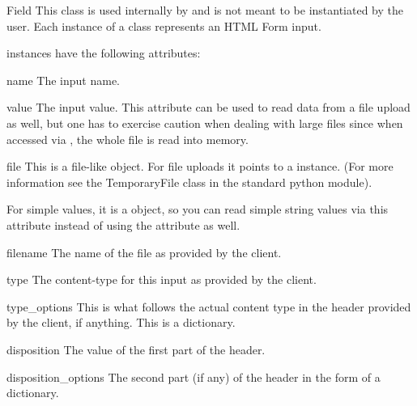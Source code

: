 \begin{classdesc}{Field}{}
  This class is used internally by  and is not
  meant to be instantiated by the user. Each instance of a 
  class represents an HTML Form input.

   instances have the following attributes:

  \begin{memberdesc}{name}
    The input name.
  \end{memberdesc}

  \begin{memberdesc}{value}
    The input value. This attribute can be used to read data from a file
    upload as well, but one has to exercise caution when dealing with
    large files since when accessed via , the whole file is
    read into memory.
  \end{memberdesc}

  \begin{memberdesc}{file}
    This is a file-like object. For file uploads it points to a 
     instance. (For more information see the TemporaryFile
    class in the standard python
     module).

    For simple values, it is a  object, so you can read
    simple string values via this attribute instead of using the 
    attribute as well.
  \end{memberdesc}

  \begin{memberdesc}{filename}
    The name of the file as provided by the client.
  \end{memberdesc}

  \begin{memberdesc}{type}
    The content-type for this input as provided by the client.
  \end{memberdesc}

  \begin{memberdesc}{type_options}
    This is what follows the actual content type in the 
    header provided by the client, if anything. This is a dictionary.
  \end{memberdesc}

  \begin{memberdesc}{disposition}
    The value of the first part of the  header.
  \end{memberdesc}

  \begin{memberdesc}{disposition_options}
    The second part (if any) of the  header in
    the form of a dictionary.
  \end{memberdesc}

  \begin{seealso}
  \end{seealso}
\end{classdesc}

